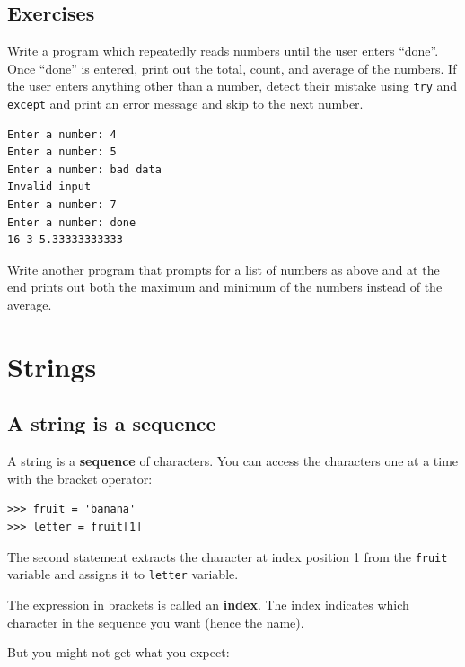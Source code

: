 \documentclass[10pt]{book}
\begin{document}
\section{Exercises}

\begin{ex}
Write a program which repeatedly reads numbers until the user
enters ``done''.
Once ``done'' is entered, print out the total, count, and average
of the numbers.  If the user enters anything other than a number, 
detect their mistake using {\tt try} and {\tt except} and 
print an error message and skip to the next number.

\begin{verbatim}
Enter a number: 4
Enter a number: 5
Enter a number: bad data
Invalid input
Enter a number: 7
Enter a number: done
16 3 5.33333333333
\end{verbatim}
\end{ex}

\begin{ex}
Write another program that prompts for a list of numbers as above
and at the end prints out both the maximum and minimum of the numbers instead of the average.
\end{ex}


\chapter{Strings}
\label{strings}


\section{A string is a sequence}

A string is a {\bf sequence} of characters.  
You can access the characters one at a time with the
bracket operator:

\beforeverb
\begin{verbatim}
>>> fruit = 'banana'
>>> letter = fruit[1]
\end{verbatim}
\afterverb
%
The second statement extracts the character at index position 1 from the 
{\tt fruit} variable and assigns it to {\tt letter} variable.  

The expression in brackets is called an {\bf index}.  
The index indicates which character in the sequence you
want (hence the name).

But you might not get what you expect:
\end{document}
